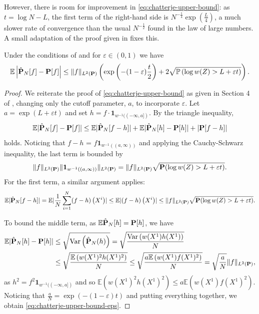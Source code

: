 However, there is room for improvement in \eqref{eq:chatterje-upper-bound}: as $t = \log N - L$, the first term of the right-hand side is $N^{-\frac{1}{4}} \exp(\frac{L}{4})$, a much slower rate of convergence than the usual $N^{-\frac{1}{2}}$ found in the law of large numbers. A small adaptation of the proof given in \citep{Chatterjee2018Sample} fixes this.

\begin{proposition}
    \label{prop:chatterje_improve}
    Under the conditions of  and for $\varepsilon \in (0,1)$ we have
    \begin{align}
        \label{eq:chatterje-upper-bound-eps}
        \mathbb E \left\lvert \hat \P_N[f] - \P [f] \right\rvert \leq \lVert f \rVert_{L^2(\P)} \left(\exp\left(- (1-\varepsilon)\frac{t}{2}\right) + 2 \sqrt{\mathbb P \left( \log w(Z) > L + \varepsilon t \right)}\right). 
    \end{align}
\end{proposition}

\begin{proof}
    We reiterate the proof of \eqref{eq:chatterje-upper-bound} as given in Section 4 of \citep{Chatterjee2018Sample}, changing only the cutoff parameter, $a$, to incorporate $\varepsilon$. Let $a = \exp \left( L + \varepsilon t \right)$ and set $h = f \cdot \mathbf 1_{w^{-1}((-\infty, a])}$. By the triangle inequality,
    $$
        \mathbb E \lvert \hat\P_{N}[f] - \P[f] \rvert \leq \mathbb E \lvert \hat \P_{N}[f - h] \rvert + \mathbb E \lvert \hat \P_{N} [h] - \P [h] \rvert + \lvert \P[f-h]\rvert
    $$
    holds. Noticing that $f - h$ = $f \mathbf 1_{w^{-1}((a, \infty))}$ and applying the Cauchy-Schwarz inequality, the last term is bounded by $$\lVert f \rVert_{L^{2}(\P)} \lVert \mathbf 1_{w^{-1}((a, \infty))} \rVert_{L^{2}(\P)} = \lVert f \rVert_{L^{2}(\P)} \sqrt{\mathbf P ( \log w(Z) > L + \varepsilon t)}.$$
    For the first term, a similar argument applies: 
    $$
        \mathbb E \lvert \hat \P_{N}[f - h] \rvert = \mathbb E \lvert \frac{1}{N} \sum_{i = 1}^{N} (f- h)\left(X^{i}\right)\rvert \leq  \mathbb E \lvert (f - h) \left( X^{i} \right) \rvert \leq \lVert f \rVert_{L^{2}(\P)} \sqrt{\mathbf P (\log w(Z) > L + \varepsilon t)}.
    $$

    To bound the middle term, as $\mathbb E \hat \P_{N}[h] = \P[h]$, we have
    \begin{align*}
        \mathbb E \lvert \hat \P_{N}[h] - \P[h] \rvert &\leq \sqrt{\var \left( \hat \P_{N}(h) \right)} = \sqrt{\frac{\var \left(w(X^{1})h(X^{1})\right)}{N}} \\
        &\leq \sqrt{\frac{\mathbb E \left(w(X^{1})^{2}h(X^{1})^{2}\right)}{N}} \leq \sqrt{\frac{a\mathbb E \left(w(X^{1})f(X^{1})^{2}\right)}{N}} = \sqrt{\frac{a}{N}} \lVert f \rVert _{L^{2}(\P)},
    \end{align*}
    as $h^{2} = f^{2} \mathbf 1_{w^{-1}((-\infty, a])}$ and so $\mathbb E \left(w(X^{1})^{2}h(X^{1})^{2}\right) \leq a \mathbb E \left(w(X^{1})f(X^{1})^{2}\right)$.
    Noticing that $ \frac{a}{N} = \exp(-(1-\varepsilon) t)$ and putting everything together, we obtain \eqref{eq:chatterje-upper-bound-eps}.
\end{proof}

